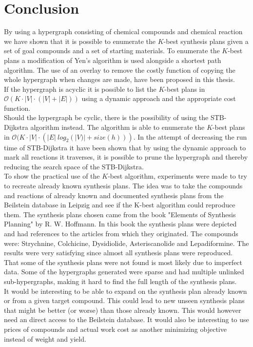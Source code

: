 \documentclass[a4paper,10pt,titlepage]{paper}
\begin{document}
\section{Conclusion}
\label{sec::Conclusion}
By using a hypergraph consisting of chemical compounds and chemical reaction we have shown that it is possible to enumerate the $K$-best synthesis plans given a set of goal compounds and a set of starting materials. To enumerate the $K$-best plans a modification of Yen's algorithm is used alongside a shortest path algorithm. The use of an overlay to remove the costly function of copying the whole hypergraph when changes are made, have been proposed in this thesis.\\ 
If the hypergraph is acyclic it is possible to list the $K$-best plans in $\mathcal{O}(K \cdot |V| \cdot (|V|+|E|))$ using a dynamic approach\cite{Carsten} and the appropriate cost function.\\
Should the hypergraph be cyclic, there is the possibility of using the STB-Dijkstra\cite{Nielsen} algorithm instead. The algorithm is able to enumerate the $K$-best plans in 
$\mathcal{O}(K \cdot |V| \cdot (|E|\ log_2 (|V)| + size(h)))$. In the attempt of decreasing the run time of STB-Dijkstra it have been shown that by using the dynamic approach to mark all reactions it traverses, it is possible to prune the hypergraph and thereby reducing the search space of the STB-Dijkstra.\\
To show the practical use of the $K$-best algorithm, experiments were made to try to recreate already known synthesis plans. The idea was to take the compounds and reactions of already known and documented synthesis plans from the Beilstein database in Leipzig and see if the K-best algorithm could reproduce them. The synthesis plans chosen came from the book "Elements of Synthesis Planning" by R. W. Hoffmann. In this book the synthesis plans were depicted and had references to the articles from which they originated. The compounds were: Strychnine, Colchicine, Dysidiolide, Asteriscanolide and Lepadiformine. The results were very satisfying since almost all synthesis plans were reproduced. That some of the synthesis plans were not found is most likely due to imperfect data. Some of the hypergraphs generated were sparse and had multiple unlinked sub-hypergraphs, making it hard to find the full length of the synthesis plans.\\
It would be interesting to be able to expand on the synthesis plan already known or from a given target compound. This could lead to new unseen synthesis plans that might be better (or worse) than those already known. This would however need an direct access to the Beilstein database. It would also be interesting to use prices of compounds and actual work cost as another minimizing objective instead of weight and yield.
\end{document}
